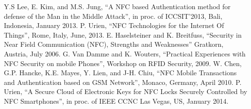 \documentclass[conference]{IEEEtran}
\begin{document}


%
%
%
\begin{thebibliography}{1}

Y.S Lee, E. Kim, and M.S. Jung, ``A NFC based Authentication method for defense 
of the Man in the Middle Attack'', in proc. of ICCSIT'2013, Bali, Indonesia, January 2013. 
P. Urien, ``NFC Technologies for the Internet Of Things'', Rome, Italy, June, 2013.
E. Haselsteiner and K. Breitfuss, ``Security in Near Field Communication (NFC), Strengths and Weaknesses'' 
Gratkorn, Austria, July 2006.
G. Van Damme and K. Wouters, ``Practical Experiences with NFC Security on mobile Phones'',
Workshop on RFID Security, 2009.
W. Chen, G.P. Hancke, K.E. Mayes, Y. Lien, and J-H. Chiu, ``NFC Mobile Transactions and Authentication based on GSM Network'', 
Monaco, Germany, April 2010.
P. Urien, ``A Secure Cloud of Electronic Keys for NFC Locks Securely Controlled by NFC Smartphones'',
in proc. of IEEE CCNC Las Vegas, US, January 2014.
\end{thebibliography}




\end{document}
